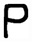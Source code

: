 \documentclass[russian,utf8,emptystyle]{eskdtext}
\begin{document}
\begin{figure}[!htb]
\includegraphics[width=\linewidth]{../data/learn/p/001}
\endminipage\hfill


\end{figure}
\end{document}
